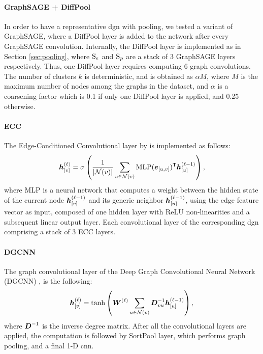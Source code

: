 \paragraph{GraphSAGE + DiffPool}
In order to have a representative \gls{dgn} with pooling, we tested a variant of GraphSAGE, where a DiffPool layer is added to the network after every GraphSAGE convolution. Internally, the DiffPool layer is implemented as in Section \ref{sec:pooling}, where $\mathrm{S}_e$ and $\mathrm{S}_p$ are a stack of 3 GraphSAGE layers respectively. Thus, one DiffPool layer requires computing 6 graph convolutions. The number of clusters $k$ is deterministic, and is obtained as $\alpha M$, where $M$ is the maximum number of nodes among the graphs in the dataset, and $\alpha$ is a coarsening factor which is 0.1 if only one DiffPool layer is applied, and 0.25 otherwise.

\paragraph{ECC}
The Edge-Conditioned Convolutional layer by \cite{simonovsky2017ecc} is implemented as follows:
$$\StateVector{v}{\ell} = \sigma\Par{ \frac{1}{|\Neigh(v)|}\sum_{u \in \Neigh(v)} \Fun{MLP}(\Elem{e}{u,v})^{\Transpose} \StateVector{u}{\ell-1}},$$
where MLP is a neural network that computes a weight between the hidden state of the current node $\Elem{h}{v}^{(\ell-1)}$ and its generic neighbor $\StateVector{u}{\ell-1}$, using the edge feature vector as input, composed of one hidden layer with ReLU non-linearities and a subsequent linear output layer. Each convolutional layer of the corresponding \gls{dgn} comprising a stack of 3 ECC layers.

\paragraph{DGCNN}
The graph convolutional layer of the Deep Graph Convolutional Neural Network (DGCNN) \citep{zhang2018dgcnn}, is the following:
$$\StateVector{v}{\ell} = \Fun{tanh} \Par{\LayerMatrix{w}{\ell} \sum_{u \in \Neigh(v)} \Matrix{D}^{-1}_{vu}\StateVector{u}{\ell-1}},$$
where $\Matrix{D}^{-1}$ is the inverse degree matrix. After all the convolutional layers are applied, the computation is followed by SortPool layer, which performs graph pooling, and a final 1-D \gls{cnn}.

